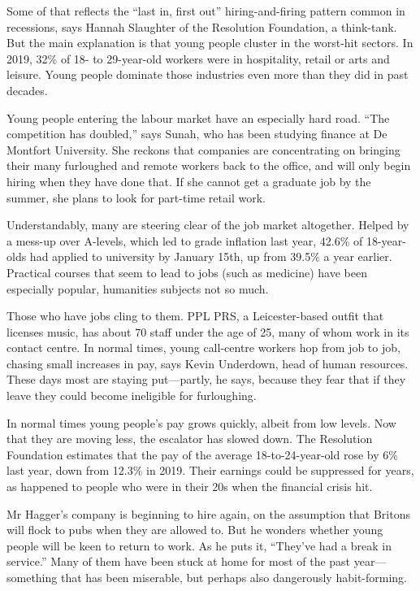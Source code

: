 \documentclass{article}
\begin{document}
Some of that reflects the ``last in, first out'' hiring-and-firing pattern common in recessions, says Hannah Slaughter of the Resolution Foundation, a think-tank. But the main explanation is that young people cluster in the worst-hit sectors. In 2019, 32\% of 18- to 29-year-old workers were in hospitality, retail or arts and leisure. Young people dominate those industries even more than they did in past decades. 

Young people entering the labour market have an especially hard road. ``The competition has doubled,'' says Sunah, who has been studying finance at De Montfort University. She reckons that companies are concentrating on bringing their many furloughed and remote workers back to the office, and will only begin hiring when they have done that. If she cannot get a graduate job by the summer, she plans to look for part-time retail work. 

Understandably, many are steering clear of the job market altogether. Helped by a mess-up over A-levels, which led to grade inflation last year, 42.6\% of 18-year-olds had applied to university by January 15th, up from 39.5\% a year earlier. Practical courses that seem to lead to jobs (such as medicine) have been especially popular, humanities subjects not so much. 

Those who have jobs cling to them. PPL PRS, a Leicester-based outfit that licenses music, has about 70 staff under the age of 25, many of whom work in its contact centre. In normal times, young call-centre workers hop from job to job, chasing small increases in pay, says Kevin Underdown, head of human resources. These days most are staying put---partly, he says, because they fear that if they leave they could become ineligible for furloughing. 

In normal times young people's pay grows quickly, albeit from low levels. Now that they are moving less, the escalator has slowed down. The Resolution Foundation estimates that the pay of the average 18-to-24-year-old rose by 6\% last year, down from 12.3\% in 2019. Their earnings could be suppressed for years, as happened to people who were in their 20s when the financial crisis hit. 

Mr Hagger's company is beginning to hire again, on the assumption that Britons will flock to pubs when they are allowed to. But he wonders whether young people will be keen to return to work. As he puts it, ``They've had a break in service.'' Many of them have been stuck at home for most of the past year---something that has been miserable, but perhaps also dangerously habit-forming.{} 
\clearpage
\end{document}
